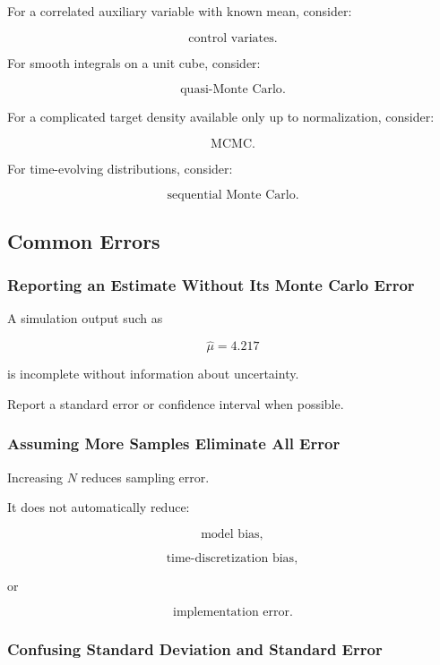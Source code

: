 For a correlated auxiliary variable with known mean, consider:

\[
\boxed{
\text{control variates}.
}
\]

For smooth integrals on a unit cube, consider:

\[
\boxed{
\text{quasi-Monte Carlo}.
}
\]

For a complicated target density available only up to normalization,
consider:

\[
\boxed{
\text{MCMC}.
}
\]

For time-evolving distributions, consider:

\[
\boxed{
\text{sequential Monte Carlo}.
}
\]

\subsection{Common Errors}
\label{subsec:monte-carlo-common-errors}

\subsubsection{Reporting an Estimate Without Its Monte Carlo Error}

A simulation output such as

\[
\widehat{\mu}=4.217
\]

is incomplete without information about uncertainty.

Report a standard error or confidence interval when possible.

\subsubsection{Assuming More Samples Eliminate All Error}

Increasing \(N\) reduces sampling error.

It does not automatically reduce:

\[
\boxed{
\text{model bias},
}
\]

\[
\boxed{
\text{time-discretization bias},
}
\]

or

\[
\boxed{
\text{implementation error}.
}
\]

\subsubsection{Confusing Standard Deviation and Standard Error}


